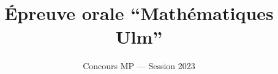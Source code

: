 \documentclass[a4paper,parskip=half-,headings=small]{scrartcl}
\title{Épreuve orale “Mathématiques Ulm”}
\subtitle{Concours MP --- Session 2023}
\date{}
\begin{document}
\maketitle
\begin{center}
  \begin{minipage}{.7\linewidth}
    \footnotesize\sffamily \doclicenseThis
  \end{minipage}
\end{center}





























\printbibliography
\end{document}
